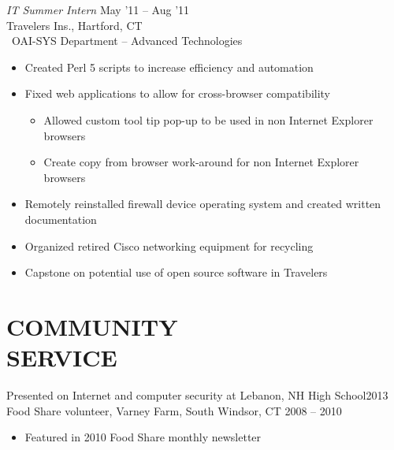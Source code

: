 \documentclass[margin]{res}
\begin{document}
\begin{resume}
                     {\sl IT Summer Intern} \hfill  May '11 -- Aug '11 \\
                     Travelers Ins., Hartford, CT\\\
                     OAI-SYS Department -- Advanced Technologies
                     \begin{itemize}  \itemsep -2pt %
                         \item Created Perl 5 scripts to increase efficiency and 
                               automation
                         \item Fixed web applications to allow for cross-browser 
                               compatibility
                         \begin{itemize}
                             \item Allowed custom tool tip pop-up to be used in non
                                   Internet Explorer \\browsers
                             \item Create copy from browser work-around for non
                                   Internet Explorer \\browsers
                         \end{itemize}
                         \item Remotely reinstalled firewall device operating
                               system and created written \\documentation
                         \item Organized retired Cisco networking equipment for
                               recycling
                         \item Capstone on potential use of open source software 
                               in Travelers
                     \end{itemize} 
 
\section{COMMUNITY \\ SERVICE} 
                Presented on Internet and computer security at Lebanon, 
                NH High School\hfill 2013\\
                Food Share volunteer, Varney Farm, South Windsor, 
                CT \hfill 2008 -- 2010
                \begin{itemize}
                    \item Featured in 2010 Food Share monthly newsletter
                \end{itemize}
     


\end{resume}
\end{document}
